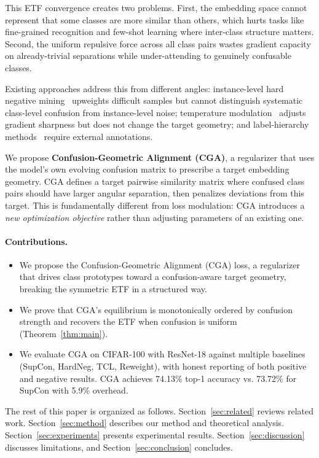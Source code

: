 \documentclass{article}
\begin{document}
This ETF convergence creates two problems. First, the embedding space cannot represent that some classes are more similar than others, which hurts tasks like fine-grained recognition and few-shot learning where inter-class structure matters. Second, the uniform repulsive force across all class pairs wastes gradient capacity on already-trivial separations while under-attending to genuinely confusable classes.

Existing approaches address this from different angles: instance-level hard negative mining~\citep{robinson2021contrastive, animesh2025tuned} upweights difficult samples but cannot distinguish systematic class-level confusion from instance-level noise; temperature modulation~\citep{kukleva2023temperature, qiu2023not} adjusts gradient sharpness but does not change the target geometry; and label-hierarchy methods~\citep{lian2024learning, dorfner2025climbing} require external annotations.

We propose \textbf{Confusion-Geometric Alignment (CGA)}, a regularizer that uses the model's own evolving confusion matrix to prescribe a target embedding geometry. CGA defines a target pairwise similarity matrix where confused class pairs should have larger angular separation, then penalizes deviations from this target. This is fundamentally different from loss modulation: CGA introduces a \emph{new optimization objective} rather than adjusting parameters of an existing one.

\paragraph{Contributions.}
\begin{itemize}
    \item We propose the Confusion-Geometric Alignment (CGA) loss, a regularizer that drives class prototypes toward a confusion-aware target geometry, breaking the symmetric ETF in a structured way.
    \item We prove that CGA's equilibrium is monotonically ordered by confusion strength and recovers the ETF when confusion is uniform (Theorem~\ref{thm:main}).
    \item We evaluate CGA on CIFAR-100 with ResNet-18 against multiple baselines (SupCon, HardNeg, TCL, Reweight), with honest reporting of both positive and negative results. CGA achieves 74.13\% top-1 accuracy vs. 73.72\% for SupCon with 5.9\% overhead.
\end{itemize}

The rest of this paper is organized as follows. Section~\ref{sec:related} reviews related work. Section~\ref{sec:method} describes our method and theoretical analysis. Section~\ref{sec:experiments} presents experimental results. Section~\ref{sec:discussion} discusses limitations, and Section~\ref{sec:conclusion} concludes.
\end{document}
